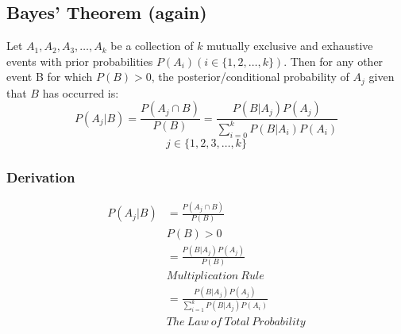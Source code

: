 \documentclass[letterpaper, 12pt]{math}
\begin{document}
\subsection*{Bayes' Theorem (again)}
Let \( A_{1}, A_{2}, A_{3}, \dots, A_{k} \) be a collection of \( k \)
mutually exclusive and exhaustive events with prior probabilities
\( P(A_{i})(i \in \{1, 2, \dots, k\}) \). Then for any other event B for which
\( P(B) > 0 \), the posterior/conditional probability of \( A_{j} \) given
that \( B \) has occurred is:
\[ P(A_{j}|B) = \frac{P(A_{j} \cap B)}{P(B)} =
   \frac{P(B|A_{j})P(A_{j})}{\sum_{i=0}^{k}P(B|A_{i})P(A_{i})} \]
\[ j \in \{1, 2, 3, \dots, k \} \]

\subsubsection*{Derivation}
\begin{align*}
  P(A_{j}|B) &= \frac{P(A_{j} \cap B)}{P(B)} \\
  & P(B) > 0 \\
  &= \frac{P(B|A_{j})P(A_{j})}{P(B)} \\
  & Multiplication\ Rule \\
  &= \frac{P(B|A_{j})P(A_{j})}{\sum_{i=1}^{k}P(B|A_{j})P(A_{i})} \\
  & The\ Law\ of\ Total\ Probability
\end{align*}
\end{document}

